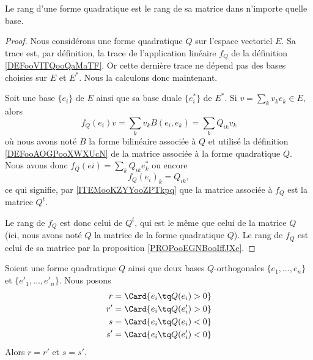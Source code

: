 \begin{proposition}     \label{PROPooLRZQooSfprff}
	Le rang d'une forme quadratique est le rang de sa matrice dans n'importe quelle base.
\end{proposition}

\begin{proof}
	Nous considérons une forme quadratique \( Q\) sur l'espace vectoriel \( E\). Sa trace est, par définition, la trace de l'application linéaire \( f_Q\) de la définition \ref{DEFooVITQooQaMaTF}. Or cette dernière trace ne dépend pas des bases choisies sur \( E\) et \( E^*\). Nous la calculons donc maintenant.

	Soit une base \( \{ e_i \}\) de \( E\) ainsi que sa base duale \( \{ e_i^* \}\) de \( E^*\). Si \( v=\sum_kv_ke_k\in E\), alors
	\begin{equation}
		f_Q(e_i)v=\sum_kv_kB(e_i,e_k)=\sum_kQ_{ik}v_k
	\end{equation}
	où nous avons noté \( B\) la forme bilinéaire associée à \( Q\) et utilisé la définition \ref{DEFooAOGPooXWXUcN} de la matrice associée à la forme quadratique \( Q\). Nous avons donc \( f_Q(ei)=\sum_kQ_{ik}e_k^*\) ou encore
	\begin{equation}
		f_Q(e_i)_k=Q_{ik},
	\end{equation}
	ce qui signifie, par \ref{ITEMooKZYYooZPTkpq} que la matrice associée à \( f_Q\) est la matrice \( Q^t\).

	Le rang de \( f_Q\) est donc celui de \( Q^t\), qui est le même que celui de la matrice \( Q\) (ici, nous avons noté \( Q\) la matrice de la forme quadratique \( Q\)). Le rang de \( f_Q\) est celui de sa matrice par la proposition \ref{PROPooEGNBooIffJXc}.
\end{proof}


\begin{lemma}     \label{LEMooISHCooVDJEKo}
	Soient une forme quadratique \( Q\) ainsi que deux bases \( Q\)-orthogonales \( \{ e_1,\ldots, e_n \}\) et \( \{ e'_1,\ldots, e'_n \}\). Nous posons
	\begin{subequations}
		\begin{align}
			r  & =\Card\{ e_i\tq Q(e_i)>0 \}  \\
			r' & =\Card\{ e_i\tq Q(e'_i)>0 \} \\
			s  & =\Card\{ e_i\tq Q(e_i)<0 \}  \\
			s' & =\Card\{ e_i\tq Q(e'_i)<0 \}
		\end{align}
	\end{subequations}
	Alors \( r=r'\) et \( s=s'\).
\end{lemma}

